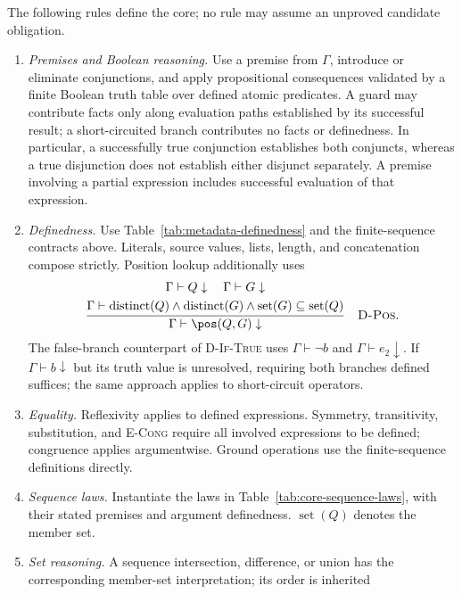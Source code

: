 The following rules define the core; no rule may assume an unproved
candidate obligation.
\begin{enumerate}
\item \emph{Premises and Boolean reasoning.} Use a premise from $\Gamma$,
introduce or eliminate conjunctions, and apply propositional consequences
validated by a finite Boolean truth table over defined atomic predicates.
A guard may contribute facts only along evaluation paths established by
its successful result; a short-circuited branch contributes no facts or
definedness. In particular, a successfully true conjunction establishes
both conjuncts, whereas a true disjunction does not establish either
disjunct separately. A premise involving a partial expression includes
successful evaluation of that expression.
\item \emph{Definedness.} Use Table~\ref{tab:metadata-definedness} and the
finite-sequence contracts above. Literals, source values, lists, length,
and concatenation compose strictly. Position lookup additionally uses
\begin{equation*}
 \frac{\begin{gathered}
       \Gamma\vdash Q\downarrow\quad\Gamma\vdash G\downarrow\\
       \Gamma\vdash\operatorname{distinct}(Q)\land
                    \operatorname{distinct}(G)\land
                    \operatorname{set}(G)\subseteq\operatorname{set}(Q)
       \end{gathered}}
      {\Gamma\vdash\pos(Q,G)\downarrow}
 \quad\text{\textsc{D-Pos}}.
\end{equation*}
The false-branch counterpart of \textsc{D-If-True} uses
$\Gamma\vdash\neg b$ and $\Gamma\vdash e_2\downarrow$.
If $\Gamma\vdash b\downarrow$ but its truth value is unresolved, requiring
both branches defined suffices; the same approach applies to short-circuit
operators.
\item \emph{Equality.} Reflexivity applies to defined expressions.
Symmetry, transitivity, substitution, and \textsc{E-Cong} require all
involved expressions to be defined; congruence applies argumentwise.
Ground operations use the finite-sequence definitions directly.
\item \emph{Sequence laws.} Instantiate the laws in
Table~\ref{tab:core-sequence-laws}, with their stated premises and
argument definedness. $\operatorname{set}(Q)$ denotes the member set.
\item \emph{Set reasoning.} A sequence intersection, difference, or union
has the corresponding member-set interpretation; its order is inherited

\end{enumerate}
